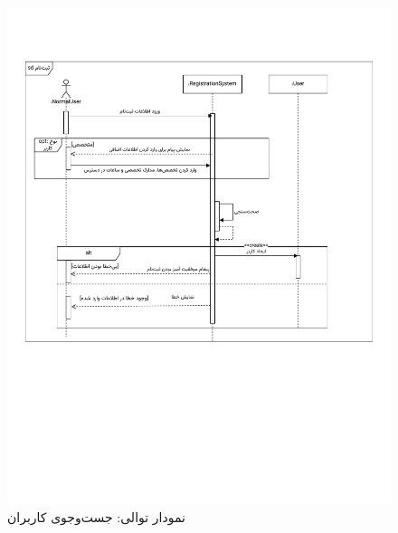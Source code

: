 \begin{figure}[ht!]
	\centering
	\includegraphics[scale=0.8, page=4]{figs/OOD-Sequence-1.pdf}
	\caption{نمودار توالی: جست‌وجوی کاربران}
\end{figure}
\FloatBarrier
\newpage

